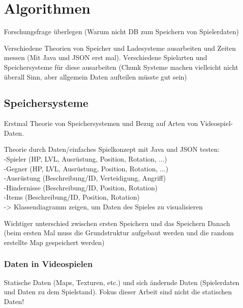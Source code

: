 \chapter{Algorithmen}\label{ch:algorithmen}
Forschungsfrage überlegen (Warum nicht DB zum Speichern von Spielerdaten)

Verschiedene Theorien von Speicher und Ladesysteme ausarbeiten und Zeiten 
messen (Mit Java und JSON erst mal). Verschiedene Spielarten und Speichersysteme
für diese ausarbeiten (Chunk Systeme machen vielleicht nicht überall Sinn, aber 
allgemein Daten aufteilen müsste gut sein)





\section{Speichersysteme}\label{sect:speichersysteme}
Erstmal Theorie von Speichersystemen und Bezug auf Arten von Videospiel-Daten.

Theorie durch Daten/einfaches Spielkonzept mit Java und JSON testen:\\
-Spieler (HP, LVL, Ausrüstung, Position, Rotation, ...)\\
-Gegner (HP, LVL, Ausrüstung, Position, Rotation, ...)\\
-Ausrüstung (Beschreibung/ID, Verteidigung, Angriff)\\
-Hindernisse (Beschreibung/ID, Position, Rotation)\\
-Items (Beschreibung/ID, Position, Rotation)\\
-> Klassendiagramm zeigen, um Daten des Spieles zu visualisieren

Wichtiger unterschied zwischen ersten Speichern und das Speichern Danach
(beim ersten Mal muss die Grundstruktur aufgebaut werden und die random
erstellte Map gespeichert werden)


\subsection{Daten in Videospielen}
Statische Daten (Maps, Texturen, etc.) und sich ändernde Daten (Spielerdaten und 
Daten zu dem Spielstand). Fokus dieser Arbeit sind nicht die statischen Daten!

